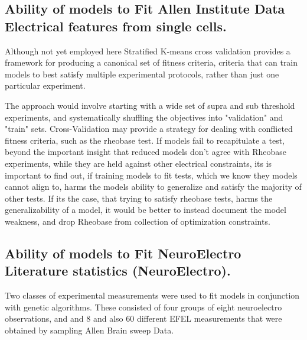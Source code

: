 \subsection{Ability of models to Fit Allen Institute Data Electrical features from single cells.}

Although not yet employed here Stratified K-means cross validation provides a framework for producing a canonical set of fitness criteria, criteria that can train models to best satisfy multiple experimental protocols, rather than just one particular experiment.

The approach would  involve starting with a wide set of supra and sub threshold experiments, and systematically shuffling the objectives into "validation" and "train" sets. Cross-Validation may provide a strategy for dealing with  conflicted fitness criteria, such as the rheobase test. If models fail to recapitulate a test, beyond the important insight that  reduced models don't agree with Rheobase experiments, while they are held against other electrical constraints, its is important to find out, if training models to fit tests, which we know they models cannot align to, harms the models ability to generalize and satisfy the majority of other tests. If its the case, that trying to satisfy rheobase tests, harms the generalizability of a model, it would be better to instead document the model weakness, and drop Rheobase from collection of optimization constraints.


\subsection{Ability of models to Fit NeuroElectro Literature statistics (NeuroElectro).}
Two classes of experimental measurements were used to fit models in conjunction with genetic algorithms. These consisted of four groups of eight neuroelectro observations, and and $8$ and also $60$ different EFEL measurements that were obtained by sampling Allen Brain sweep Data.


